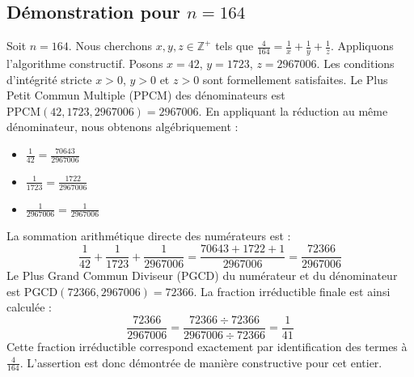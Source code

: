 \documentclass[11pt,a4paper]{article}
\begin{document}
\subsection{Démonstration pour $n = 164$}
Soit $n = 164$. Nous cherchons $x, y, z \in \mathbb{Z}^{+}$ tels que $\frac{4}{164} = \frac{1}{x} + \frac{1}{y} + \frac{1}{z}$.
Appliquons l'algorithme constructif. Posons $x = 42$, $y = 1723$, $z = 2967006$.
Les conditions d'intégrité stricte $x > 0$, $y > 0$ et $z > 0$ sont formellement satisfaites.
Le Plus Petit Commun Multiple (PPCM) des dénominateurs est $\text{PPCM}(42, 1723, 2967006) = 2967006$.
En appliquant la réduction au même dénominateur, nous obtenons algébriquement :
\begin{itemize}
    \item $\frac{1}{42} = \frac{70643}{2967006}$
    \item $\frac{1}{1723} = \frac{1722}{2967006}$
    \item $\frac{1}{2967006} = \frac{1}{2967006}$
\end{itemize}
La sommation arithmétique directe des numérateurs est :
$$ \frac{1}{42} + \frac{1}{1723} + \frac{1}{2967006} = \frac{70643 + 1722 + 1}{2967006} = \frac{72366}{2967006} $$
Le Plus Grand Commun Diviseur (PGCD) du numérateur et du dénominateur est $\text{PGCD}(72366, 2967006) = 72366$.
La fraction irréductible finale est ainsi calculée :
$$ \frac{72366}{2967006} = \frac{72366 \div 72366}{2967006 \div 72366} = \frac{1}{41} $$
Cette fraction irréductible correspond exactement par identification des termes à $\frac{4}{164}$. L'assertion est donc démontrée de manière constructive pour cet entier.
\end{document}
